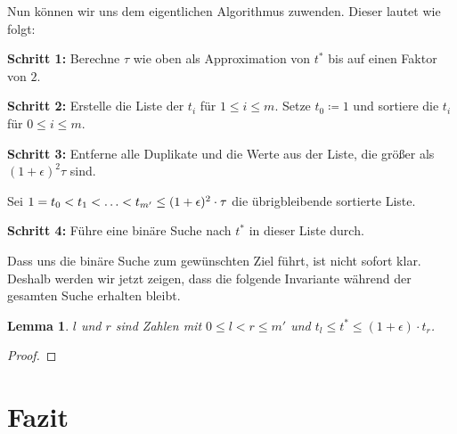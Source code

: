 \documentclass[11pt]{article}
\newtheorem{lemma}[theorem]{Lemma}
\begin{document}
	Nun können wir uns dem eigentlichen Algorithmus zuwenden. Dieser lautet wie folgt:
	
	\begin{description}
		\item{\textbf{Schritt 1:}} Berechne $\tau$ wie oben als Approximation von $t^*$ bis auf einen Faktor von $2$.
		\item{\textbf{Schritt 2:}} Erstelle die Liste der $t_i$ für $1 \leq i \leq m$. Setze $t_0 \coloneqq 1$ und sortiere die $t_i$ für $0 \leq i \leq m$.
		\item{\textbf{Schritt 3:}} Entferne alle Duplikate und die Werte aus der Liste, die größer als $(1 + \epsilon)^2 \tau$ sind.
		
		Sei $1 = t_0 < t_1 < \mathellipsis < t_{m'} \leq (1 + \epsilon)^2\cdot \tau$ die übrigbleibende sortierte Liste.
		\item{\textbf{Schritt 4:}} Führe eine binäre Suche nach $t^*$ in dieser Liste durch.
	\end{description}
	
	Dass uns die binäre Suche zum gewünschten Ziel führt, ist nicht sofort klar. Deshalb werden wir jetzt zeigen, dass die folgende Invariante während der gesamten Suche erhalten bleibt.
	
	\begin{lemma}
		$l$ und $r$ sind Zahlen mit $0 \leq l < r \leq m'$ und $t_l \leq t^* \leq (1 + \epsilon)\cdot t_r$.
	\end{lemma}
	\begin{proof}
		
	\end{proof}
	
	\section{Fazit}
    \label{sec:fazit}

    
    
\end{document}
